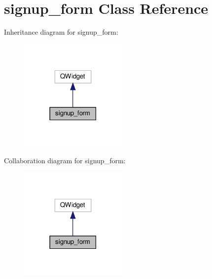 \hypertarget{classsignup__form}{}\section{signup\+\_\+form Class Reference}
\label{classsignup__form}


Inheritance diagram for signup\+\_\+form\+:\nopagebreak
\begin{figure}[H]
\begin{center}
\leavevmode
\includegraphics[width=150pt]{classsignup__form__inherit__graph}
\end{center}
\end{figure}


Collaboration diagram for signup\+\_\+form\+:\nopagebreak
\begin{figure}[H]
\begin{center}
\leavevmode
\includegraphics[width=150pt]{classsignup__form__coll__graph}
\end{center}
\end{figure}
